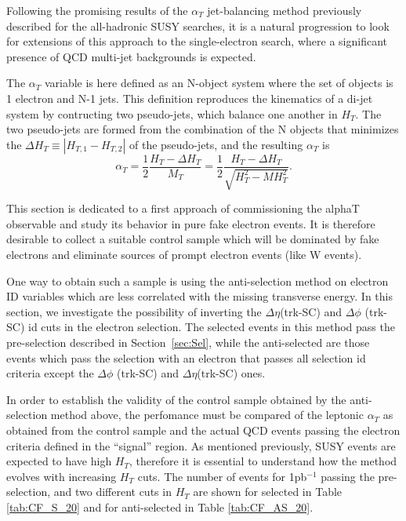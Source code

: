 Following the promising results of the $\alpha_{T}$ jet-balancing method previously described for the all-hadronic SUSY searches, it is a natural progression to look for extensions of this approach to the single-electron search, where a significant presence of QCD multi-jet backgrounds is expected.

The $\alpha_{T}$ variable is here defined as an N-object system where the set of objects is 1 electron and N-1 jets. This definition reproduces the kinematics of a di-jet system by contructing two pseudo-jets, which balance one another in $H_{T}$. The two pseudo-jets are formed from the combination of the N objects that minimizes the $\Delta H_{T} \equiv |H_{T,1} - H_{T,2}|$ of the pseudo-jets, and the resulting  $\alpha_{T}$ is
\begin{equation}
\alpha_{T} = \frac{1}{2} \frac{H_{T} - \Delta H_{T}}{M_{T}} =  \frac{1}{2} \frac{H_{T} - \Delta H_{T}}{\sqrt{H_{T}^{2}-MH_{T}^{2}}}.
\end{equation}

This section is dedicated to a first approach of commissioning the alphaT observable and study its behavior in pure fake electron events. It is therefore desirable to collect a suitable control sample which will be dominated by fake electrons and eliminate sources of prompt electron events (like W events).

One way to obtain such a sample is using the anti-selection method on electron ID variables which are less correlated with the missing transverse energy. In this section, we investigate the possibility of inverting the $\Delta \eta$(trk-SC) and $\Delta \phi$ (trk-SC) id cuts in the electron selection. The selected events in this method pass the pre-selection described in Section~\ref{sec:Sel}, while the anti-selected are those events which pass the selection with an electron that passes all selection id criteria except the $\Delta \phi$ (trk-SC) and $\Delta \eta$(trk-SC) ones. 

In order to establish the validity of the control sample obtained by the anti-selection method above, the perfomance must be compared of the leptonic $\alpha_T$ as obtained from the control sample and the actual QCD events passing the electron criteria defined in the ``signal'' region. As mentioned previously, SUSY events are expected to have high $H_{T}$, therefore it is essential to understand how the method evolves with increasing $H_{T}$ cuts. The number of events for 1pb$^{-1}$ passing the pre-selection, and two different cuts in $H_{T}$ are shown for selected in Table \ref{tab:CF_S_20} and for anti-selected in Table \ref{tab:CF_AS_20}. 

